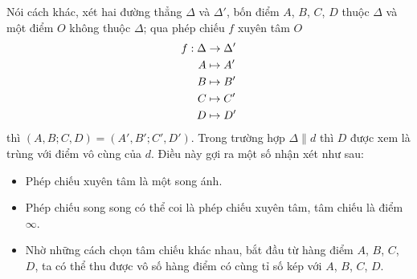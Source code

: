         Nói cách khác, xét hai đường thẳng \(\Delta\) và \(\Delta'\), bốn điểm \(A\), \(B\), \(C\), \(D\) thuộc \(\Delta\) và một điểm \(O\) không thuộc \(\Delta\); qua phép chiếu \(f\) xuyên tâm \(O\)
        \begin{equation}
            \begin{aligned}
                f: \Delta & \to \Delta' \\
                A & \mapsto A' \\
                B & \mapsto B' \\
                C & \mapsto C' \\
                D & \mapsto D'
            \end{aligned}
            \notag
        \end{equation}
        thì \((A,B;C,D) = (A',B';C',D')\). Trong trường hợp \(\Delta \parallel d\) thì \(D\) được xem là trùng với điểm vô cùng của \(d\). Điều này gợi ra một số nhận xét như sau:
        \begin{itemize}
            \item Phép chiếu xuyên tâm là một song ánh.
            \item Phép chiếu song song có thể coi là phép chiếu xuyên tâm, tâm chiếu là điểm \(\infty\).
            \item Nhờ những cách chọn tâm chiếu khác nhau, bắt đầu từ hàng điểm \(A\), \(B\), \(C\), \(D\), ta có thể thu được vô số hàng điểm có cùng tỉ số kép với \(A\), \(B\), \(C\), \(D\).
        \end{itemize}

